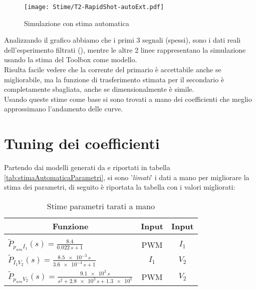 \begin{figure}[H]
	\centering
	\caption[Simulazione con stima automatica]{Simulazione con stima automatica}
	\texttt{[image: Stime/T2-RapidShot-autoExt.pdf]}
\end{figure}

\noindent
Analizzando il grafico abbiamo che i primi 3 segnali (spessi), sono i dati reali dell'esperimento filtrati (), mentre le altre 2 linee rappresentano la simulazione usando la stima del Toolbox come modello.\\
Risulta facile vedere che la corrente del primario è accettabile anche se migliorabile, ma la funzione di trasferimento stimata per il secondario è completamente sbagliata, anche se dimensionalmente è simile.\\
Usando queste stime come base si sono trovati a mano dei coefficienti che meglio approssimano l'andamento delle curve.


\section{Tuning dei coefficienti}
Partendo dai modelli generati da \cite*{IdentificationToolbox} e riportati in tabella \ref{tab:stimaAutomaticaParametri}, si sono '\textit{limati}' i dati a mano per migliorare la stima dei parametri, di seguito è riportata la tabella con i valori migliorati:
\begin{table}[H]
	\centering
	\caption[Stime parametri tarati a mano]{Stime parametri tarati a mano}		\label{tab:stimaManualeParametri}
	\vspace{1mm}
	\begin{tabular}[t]{||l|c|c||}
		\hline
		\multicolumn{1}{||c}{\textbf{Funzione}}                                                & \multicolumn{1}{|c}{\textbf{Input}} & \multicolumn{1}{|c||}{\textbf{Input}} \\
		\hline\hline
		                                                                                       &                                     &                                       \\[-3mm]
		$\tilde{P}_{p_{wm} I_1}(s) = \frac{8.4}{0.022\,s+1}$                                   & PWM                                 & $I_1$                                 \\[3mm]

		$\tilde{P}_{I_1 V_2}(s) = \frac{\num{8.5e-3}\,s}{\num{3.6e-4}\,s+1}$                   & $I_1$                               & $V_2$                                 \\[3mm]

		$\tilde{P}_{p_{wm} V_2}(s) = \frac{\num{9.1e+3}\,s}{s^2+\num{2.8e+3}\,s+\num{1.3e+5}}$ & PWM                                 & $ V_2 $                               \\
		\hline
	\end{tabular}
\end{table}

